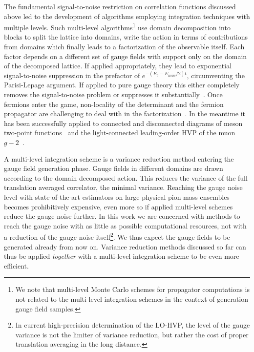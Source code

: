 The fundamental signal-to-noise restriction on correlation functions discussed above led to the development of algorithms employing integration techniques with multiple levels.
Such multi-level algorithms\footnote{We note that multi-level Monte Carlo schemes for propagator computations is not related to the multi-level integration schemes in the context of generation gauge field samples.} use domain decomposition into blocks
to split the lattice into domains, write the action in terms of contributions from domains which finally leads to a factorization of the observable itself.
Each factor depends on a different set of gauge fields with support only on the domain of the decomposed lattice.
If applied appropriately, they lead to exponential signal-to-noise suppression in the prefactor of $e^{-(E_0 - E_{\text{noise}}/2)t}$, circumventing the Parisi-Lepage argument.
If applied to pure gauge theory this either completely removes the signal-to-noise problem or suppresses it substantially~\cite{Luscher:2001up,Meyer:2002cd,DellaMorte:2007zz,DellaMorte:2008jd,della2011novel}.
Once fermions enter the game, non-locality of the determinant and the fermion propagator are challenging to deal with in the factorization~\cite{Ce:2016idq,Ce:2016ajy,Giusti:2017ksp,Ce:2017ndt}.
In the meantime it has been successfully applied to connected and disconnected diagrams of meson two-point functions~\cite{Giusti:2018vxm} and the light-connected leading-order HVP of the muon $g-2$~\cite{DallaBrida:2020cik,Giusti:2021qhk}.

A multi-level integration scheme is a variance reduction method entering the gauge field generation phase.
Gauge fields in different domains are drawn according to the domain decomposed action.
This reduces the variance of the full translation averaged correlator, \ie the minimal variance. %
Reaching the gauge noise level with state-of-the-art estimators on large physical pion mass ensembles becomes prohibitively expensive, even more so if applied multi-level schemes reduce the gauge noise further.
In this work we are concerned with methods to reach the gauge noise with as little as possible computational resources, not with a reduction of the gauge noise itself\footnote{
In current high-precision determination of the LO-HVP, the level of the gauge variance is not the limiter of variance reduction, but rather the cost of proper translation averaging in the long distance.
}.
We thus expect the gauge fields to be generated already from now on.
Variance reduction methods discussed so far can thus be applied \emph{together} with a multi-level integration scheme to be even more efficient. 

